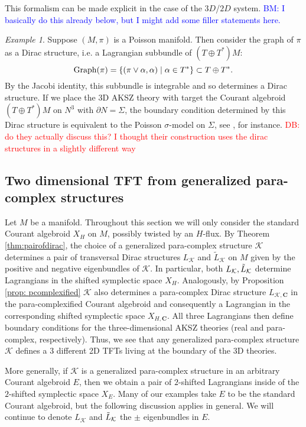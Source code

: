 \documentclass[letterpaper,12pt]{article}
\newcommand{\TT}{{T\oplus T^*}}
\newcommand{\KK}{\mathcal{K}}
\newcommand{\Cc}{\mathbf{C}}
\theoremstyle{definition}
\theoremstyle{remark}
\theoremstyle{examples}
\newtheorem{Ex}[theorem]{Example}
\def\brian{\textcolor{blue}{BM: }\textcolor{blue}}
\def\david{\textcolor{red}{DB: }\textcolor{red}}
\begin{document}
This formalism can be made explicit in the case of the $3D$/$2D$ system. \brian{I basically do this already below, but I might add some filler statements here.}

\begin{Ex}
Suppose $(M, \pi)$ is a Poisson manifold. 
Then consider the graph of $\pi$ as a Dirac structure, i.e. a Lagrangian subbundle of $(\TT)M$:
\[
{\rm Graph}(\pi) = \{(\pi \vee \alpha , \alpha) \; | \; \alpha \in T^* \} \subset \TT .
\]
By the Jacobi identity, this subbundle is integrable and so determines a Dirac structure. 
If we place the 3D AKSZ theory with target the Courant algebroid $(\TT)M$ on $N^3$ with $\partial N = \Sigma$, the boundary condition determined by this Dirac structure is equivalent to the Poisson $\sigma$-model on $\Sigma$, see \cite{KSSdirac}, for instance. \david{do they actually discuss this? I thought their construction uses the dirac structures in a slightly different way}
\end{Ex}

\subsection{Two dimensional TFT from generalized para-complex structures}

Let $M$ be a manifold.
Throughout this section we will only consider the standard Courant algebroid $X_H$ on $M$, possibly twisted by an $H$-flux.
By Theorem \ref{thm:pairofdirac}, the choice of a generalized para-complex structure $\KK$ determines a pair of transversal Dirac structures $L_{\KK}$ and $\tilde{L}_{\KK}$ on $M$ given by the positive and negative eigenbundles of $\KK$. 
In particular, both $L_{\KK}, \Tilde{L}_{\KK}$ determine Lagrangians in the shifted symplectic space $X_{H}$. Analogously, by Proposition
\ref{prop: pcomplexified} $\KK$ also determines a para-complex Dirac structure $L_{\KK,\Cc}$ in the para-complexified Courant algebroid and consequently a Lagrangian in the corresponding shifted symplectic space $X_{H,\Cc}$. All three Lagrangians then define boundary conditions for the three-dimensional AKSZ theories (real and para-complex, respectively).
Thus, we see that any generalized para-complex structure $\KK$ defines a $3$ different 2D TFTs living at the boundary of the 3D theories.

More generally, if $\KK$ is a generalized para-complex structure in an arbitrary Courant algebroid $E$, then we obtain a pair of $2$-shifted Lagrangians inside of the $2$-shifted symplectic space $X_E$. 
Many of our examples take $E$ to be the standard Courant algebroid, but the following discussion applies in general. 
We will continue to denote $L_{\KK}$ and $\Tilde{L}_{\KK}$ the $\pm$ eigenbundles in $E$. 
\end{document}

